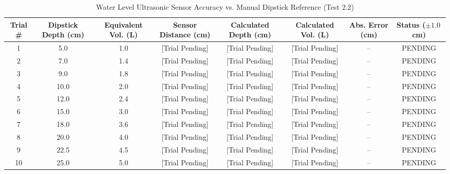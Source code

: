 \begin{table}[htbp!]
\centering
\caption{Water Level Ultrasonic Sensor Accuracy vs. Manual Dipstick Reference (Test 2.2)}
\label{tab:water_sensor_accuracy}
\begin{adjustbox}{width=\textwidth}
\begin{tabular}{cccccccc}
\toprule
\textbf{Trial \#} & \textbf{Dipstick Depth (cm)} & \textbf{Equivalent Vol. (L)} & \textbf{Sensor Distance (cm)} & \textbf{Calculated Depth (cm)} & \textbf{Calculated Vol. (L)} & \textbf{Abs. Error (cm)} & \textbf{Status ($\pm 1.0$\,cm)} \\
\midrule
1 & 5.0 & 1.0 & [Trial Pending] & [Trial Pending] & [Trial Pending] & -- & PENDING \\
2 & 7.0 & 1.4 & [Trial Pending] & [Trial Pending] & [Trial Pending] & -- & PENDING \\
3 & 9.0 & 1.8 & [Trial Pending] & [Trial Pending] & [Trial Pending] & -- & PENDING \\
4 & 10.0 & 2.0 & [Trial Pending] & [Trial Pending] & [Trial Pending] & -- & PENDING \\
5 & 12.0 & 2.4 & [Trial Pending] & [Trial Pending] & [Trial Pending] & -- & PENDING \\
6 & 15.0 & 3.0 & [Trial Pending] & [Trial Pending] & [Trial Pending] & -- & PENDING \\
7 & 18.0 & 3.6 & [Trial Pending] & [Trial Pending] & [Trial Pending] & -- & PENDING \\
8 & 20.0 & 4.0 & [Trial Pending] & [Trial Pending] & [Trial Pending] & -- & PENDING \\
9 & 22.5 & 4.5 & [Trial Pending] & [Trial Pending] & [Trial Pending] & -- & PENDING \\
10 & 25.0 & 5.0 & [Trial Pending] & [Trial Pending] & [Trial Pending] & -- & PENDING \\
\bottomrule
\end{tabular}
\end{adjustbox}
\end{table}

